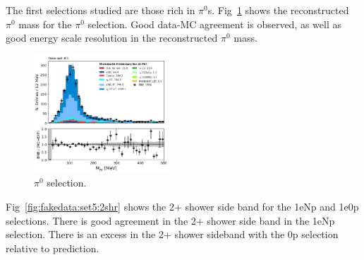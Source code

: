 The first selections studied are those rich in $\pi^{0}$s. Fig~\ref{fig:fakedata:set5:pi0} shows the reconstructed $\pi^{0}$ mass for the $\pi^{0}$ selection. Good data-MC agreement is observed, as well as good energy scale resolution in the reconstructed $\pi^{0}$ mass. 
\begin{figure}[H]
\begin{center}
\includegraphics[width=0.45\textwidth]{Fakedata/set5/pi0.pdf}
\caption{\label{fig:fakedata:set5:pi0} $\pi^{0}$ selection.}
\end{center}
\end{figure}

Fig~\ref{fig:fakedata:set5:2shr} shows the 2+ shower side band for the 1eNp and 1e0p selections. There is good agreement in the 2+ shower side band in the 1eNp selection.  There is an excess in the 2+ shower sideband with the 0p selection relative to prediction.  

